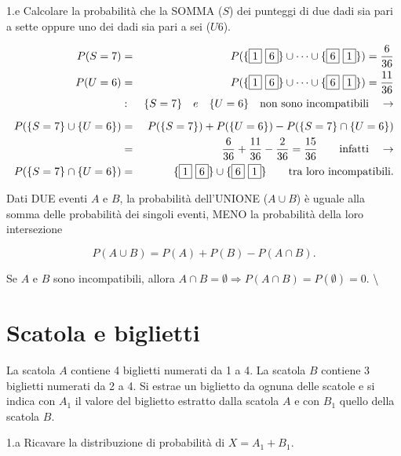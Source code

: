\documentclass[
  11pt,
]{book}
\theoremstyle{mytheoremstyle}
\theoremstyle{mydefstyle}
\newenvironment{sol}
  {
  \begin{tcolorbox}[enhanced,breakable,arc=0.1mm,boxrule=1pt,colback=white,colframe=iblue,
  title=\bf \fontfamily{lmss}\selectfont \hspace{.5 cm} Soluzione,drop fuzzy shadow]

}{
\end{tcolorbox}
  }
\begin{document}
1.e Calcolare la probabilità che la SOMMA (\(S\))
dei punteggi di due dadi sia pari a sette oppure
uno dei dadi sia pari a sei (\(U6\)).

\begin{sol}
\begin{eqnarray*}
P(S=7) &=& P(\{\fbox{1}\ \fbox{6}\} \cup  \cdots \cup \{\fbox{6}\ \fbox{1}\})
        =  \frac{6} {36} \\
P(U=6) &=& P(\{\fbox{1}\ \fbox{6}\} \cup  \cdots \cup \{\fbox{6}\ \fbox{1}\})
        = \frac{11} {36} \\
       &:& \{ S=7 \}\quad e \quad \{ U=6 \}\quad \mbox{non sono incompatibili}
           \quad\rightarrow \\[0.2cm]
           P(\{ S=7 \} \cup \{ U=6 \})
       &=& P(\{ S=7 \}) +  P(\{ U=6 \}) - P(\{ S=7 \} \cap \{ U=6 \}) \\
       &=& \frac{6} {36} + \frac{11} {36} - \frac{2} {36}
        =  \frac{15} {36} \qquad \mbox{infatti} \quad\rightarrow    \\
           P(\{ S=7 \} \cap \{ U=6 \})
       &=& \{ \fbox{1}\ \fbox{6} \} \cup \{ \fbox{6}\ \fbox{1} \}
           \qquad \mbox{tra loro incompatibili}   .
\end{eqnarray*}

Dati DUE eventi \(A\) e \(B\), la probabilità dell'UNIONE (\(A\cup B\))
è uguale alla somma delle probabilità dei singoli eventi, MENO
la probabilità della loro intersezione

\[
P(A \cup B) = P(A) + P(B) - P(A \cap B)  .
\]

Se \(A\) e \(B\) sono incompatibili, allora
\(A \cap B = \emptyset \Rightarrow P(A \cap B)=P(\emptyset)=0\). \textbackslash{}

\end{sol}

\section{Scatola e biglietti}\label{scatola-e-biglietti}

La scatola \(A\) contiene 4 biglietti numerati da 1 a 4.
La scatola \(B\) contiene 3 biglietti numerati da 2 a 4.
Si estrae un biglietto da ognuna delle scatole e si indica
con \(A_{1}\) il valore del biglietto estratto dalla scatola \(A\) e
con \(B_{1}\) quello della scatola \(B\).

1.a Ricavare la distribuzione di probabilità di \(X=A_{1}+B_{1}\).
\end{document}
